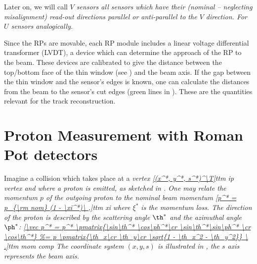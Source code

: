 Later on, we will call \em{$V$ sensors} all sensors which have their (nominal -- neglecting misalignment) read-out directions parallel or anti-parallel to the $V$ direction. For $U$ sensors analogically.



Since the RPs are movable, each RP module includes a linear voltage differential transformer (LVDT), a device which can determine the approach of the RP to the beam. These devices are calibrated to give the distance between the top/bottom face of the thin window (see ) and the beam axis. If the gap between the thin window and the sensor's edges is known, one can calculate the distances from the beam to the sensor's cut edges (green lines in ). These are the quantities relevant for the track reconstruction.




\section[rp measurement]{Proton Measurement with Roman Pot detectors}



Imagine a collision which takes place at a \em{vertex}
\eqref{(x^*, y^*, s^*)^\T}{ttm ip vertex}
and where a proton is emitted, as sketched in . One may relate the momentum $p$ of the outgoing proton to the nominal beam momentum
\eqref{p^* = p_{\rm nom} (1 - \xi^*)\ ,}{ttm xi}
where $\xi^*$ is the \em{momentum loss}. The direction of the proton is described by the \em{scattering angle} $\th^*$ and the \em{azimuthal angle} $\ph^*$:
\eqref{\vec p^* = p^* \pmatrix{\sin\th^* \cos\ph^*\cr \sin\th^*\sin\ph^* \cr \cos\th^*}
\ .}{ttm mom comp}
The coordinate system $(x, y, s)$ is illustrated in , the $s$ axis represents the beam axis.

